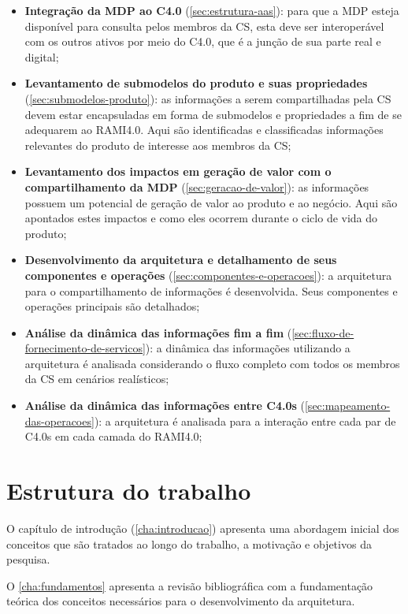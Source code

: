 \begin{itemize}
	\item \textbf{Integração da MDP ao C4.0} (\autoref{sec:estrutura-aas}): para que a MDP esteja disponível para consulta pelos membros da CS, esta deve ser interoperável com os outros ativos por meio do C4.0, que é a junção de sua parte real e digital;
	\item \textbf{Levantamento de submodelos do produto e suas propriedades} (\autoref{sec:submodelos-produto}): as informações a serem compartilhadas pela CS devem estar encapsuladas em forma de submodelos e propriedades a fim de se adequarem ao RAMI4.0. Aqui são identificadas e classificadas informações relevantes do produto de interesse aos membros da CS;
	\item \textbf{Levantamento dos impactos em geração de valor com o compartilhamento da MDP} (\autoref{sec:geracao-de-valor}): as informações possuem um potencial de geração de valor ao produto e ao negócio. Aqui são apontados estes impactos e como eles ocorrem durante o ciclo de vida do produto;
	\item \textbf{Desenvolvimento da arquitetura e detalhamento de seus componentes e operações} (\autoref{sec:componentes-e-operacoes}): a arquitetura para o compartilhamento de informações é desenvolvida. Seus componentes e operações principais são detalhados;
	\item \textbf{Análise da dinâmica das informações fim a fim} (\autoref{sec:fluxo-de-fornecimento-de-servicos}): a dinâmica das informações utilizando a arquitetura é analisada considerando o fluxo completo com todos os membros da CS em cenários realísticos;
	\item \textbf{Análise da dinâmica das informações entre C4.0s} (\autoref{sec:mapeamento-das-operacoes}): a arquitetura é analisada para a interação entre cada par de C4.0s em cada camada do RAMI4.0;
\end{itemize}

\section{Estrutura do trabalho}
\label{sec:estrutura}

O capítulo de introdução (\autoref{cha:introducao}) apresenta uma abordagem inicial dos conceitos que são tratados ao longo do trabalho, a motivação e objetivos da pesquisa.

O \autoref{cha:fundamentos} apresenta a revisão bibliográfica com a fundamentação teórica dos conceitos necessários para o desenvolvimento da arquitetura.

